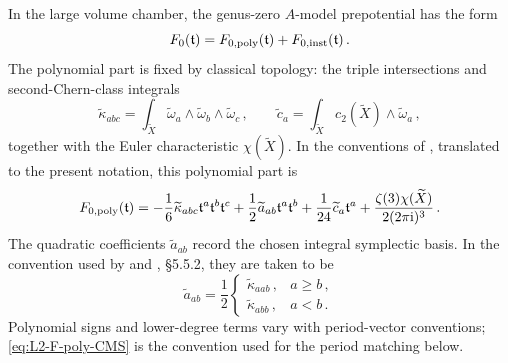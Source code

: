 In the large volume chamber, the genus-zero $A$-model prepotential has
the form
\begin{equation}
    F_0(\mathfrak t)
    =
    F_{0,{\rm poly}}(\mathfrak t)
    +
    F_{0,{\rm inst}}(\mathfrak t)\, .
\end{equation}
The polynomial part is fixed by classical topology: the triple
intersections and second-Chern-class integrals
\begin{equation}
    \widetilde\kappa_{abc}
    =
    \int_{\widetilde X}
    \widetilde\omega_a\wedge\widetilde\omega_b\wedge
    \widetilde\omega_c\, ,
    \qquad
    \widetilde c_a
    =
    \int_{\widetilde X}c_2(\widetilde X)\wedge
    \widetilde\omega_a\, ,
\end{equation}
together with the Euler characteristic $\chi(\widetilde X)$.
In the conventions of \cite{Demirtas:2023als}, translated to the
present notation, this polynomial part is
\begin{equation}\label{eq:L2-F-poly-CMS}
    F_{0,{\rm poly}}(\mathfrak t)
    =
    -\frac{1}{6}\widetilde\kappa_{abc}
      \mathfrak t^a\mathfrak t^b\mathfrak t^c
    +\frac{1}{2}\widetilde a_{ab}\mathfrak t^a\mathfrak t^b
    +\frac{1}{24}\widetilde c_a\mathfrak t^a
    +\frac{\zeta(3)\chi(\widetilde X)}{2(2\pi\mathrm{i})^3}\, .
\end{equation}
The quadratic coefficients $\widetilde a_{ab}$ record the chosen
integral symplectic basis.  In the convention used by
\cite{Demirtas:2023als} and \cite{McAllister:2025qwq}, \S5.5.2, they
are taken to be
\begin{equation}\label{eq:L2-a-ab}
    \widetilde a_{ab}
    =
    \frac{1}{2}
    \begin{cases}
        \widetilde\kappa_{aab}\, , & a\geq b\, ,\\
        \widetilde\kappa_{abb}\, , & a<b\, .
    \end{cases}
\end{equation}
Polynomial signs and lower-degree terms vary with period-vector
conventions; \eqref{eq:L2-F-poly-CMS} is the convention used for the
period matching below.

